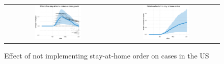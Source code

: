 \documentclass[11pt,reqno,letter]{amsart}
\theoremstyle{definition}
\begin{document}
\begin{figure}[ht]
  \caption{Effect  of  not implementing stay-at-home order on cases in the US  \label{fig:US-shelter-dgrowth}}
  \begin{minipage}{\linewidth}
    \centering
    \begin{tabular}{cc}
      \includegraphics[width=0.45\textwidth]{tables_and_figures/us-shelter-dgrowth_v1}
      &
        \includegraphics[width=0.45\textwidth]{tables_and_figures/us-shelter-rel_v1}
    \end{tabular}
  \end{minipage}
\end{figure}




\end{document}
